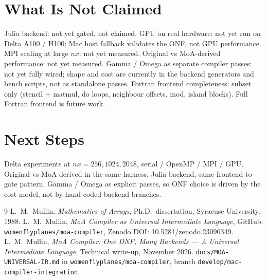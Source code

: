 \documentclass[11pt]{article}
\begin{document}
\section{What Is Not Claimed}
Julia backend: not yet gated, not claimed. GPU on real hardware: not yet
run on Delta A100 / H100; Mac host fallback validates the ONF, not GPU
performance. MPI scaling at large $nx$: not yet measured. Original vs
MoA-derived performance: not yet measured. Gamma / Omega as separate
compiler passes: not yet fully wired; shape and cost are currently in the
backend generators and bench scripts, not as standalone passes. Fortran
frontend completeness: subset only (stencil + matmul, do loops, neighbour
offsets, mod, island blocks). Full Fortran frontend is future work.

\section{Next Steps}
Delta experiments at $nx=256, 1024, 2048$, serial / OpenMP / MPI / GPU.
Original vs MoA-derived in the same harness. Julia backend, same
frontend-to-gate pattern. Gamma / Omega as explicit passes, so ONF choice
is driven by the cost model, not by hand-coded backend branches.

\begin{thebibliography}{9}
 L.~M.~Mullin, \emph{Mathematics of Arrays}, Ph.D.\ dissertation, Syracuse University, 1988.
 L.~M.~Mullin, \emph{MoA Compiler as Universal Intermediate Language}, GitHub: \texttt{womenflyplanes/moa-compiler}, Zenodo DOI: 10.5281/zenodo.23090349.
 L.~M.~Mullin, \emph{MoA Compiler: One DNF, Many Backends --- A Universal Intermediate Language}, Technical write-up, November 2026. \texttt{docs/MOA-UNIVERSAL-IR.md} in \texttt{womenflyplanes/moa-compiler}, branch \texttt{develop/mac-compiler-integration}.
\end{thebibliography}
\end{document}
